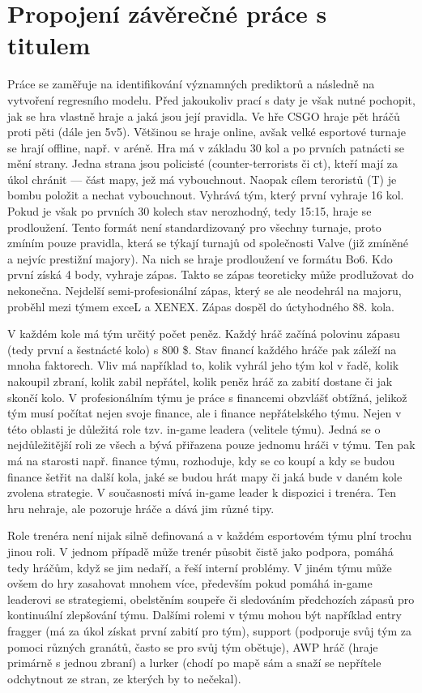 \newpage
\section{Propojení závěrečné práce s titulem}
Práce se zaměřuje na identifikování významných prediktorů a následně na vytvoření regresního modelu. Před jakoukoliv prací s daty je však nutné pochopit, jak se hra vlastně hraje
a jaká jsou její pravidla. Ve hře \ac{CSGO} hraje pět hráčů proti pěti (dále jen 5v5). Většinou se hraje online, avšak velké esportové turnaje se hrají offline, např. v aréně.
Hra má v základu 30 kol a po  prvních patnácti se mění strany. Jedna strana jsou policisté (counter-terrorists či ct), kteří mají za úkol chránit  --- část mapy,
jež má vybouchnout. Naopak cílem teroristů (T) je bombu položit a  nechat vybouchnout. Vyhrává tým, který první vyhraje 16 kol. Pokud je však po prvních 30 kolech
stav nerozhodný, tedy 15:15, hraje se prodloužení. Tento formát není standardizovaný pro všechny turnaje, proto zmíním pouze pravidla, která se týkají turnajů od společnosti
Valve (již zmíněné a nejvíc prestižní majory). Na nich se hraje prodloužení ve formátu Bo6. Kdo první získá 4 body, vyhraje zápas. Takto se zápas teoreticky může prodlužovat
do nekonečna. Nejdelší semi-profesionální zápas, který se ale neodehrál na majoru, proběhl mezi týmem exceL a XENEX\cite{professeur_hltvorg_2015}.
Zápas dospěl do úctyhodného 88. kola.

V každém kole má tým určitý počet peněz. Každý hráč začíná polovinu zápasu (tedy první a šestnácté kolo) s 800 \$. Stav financí každého hráče pak záleží na mnoha faktorech.
Vliv má například to, kolik vyhrál jeho tým kol v řadě, kolik nakoupil zbraní, kolik zabil nepřátel, kolik peněz hráč za zabití dostane či jak skončí kolo. V profesionálním
týmu je práce s financemi obzvlášť obtížná, jelikož tým musí počítat nejen svoje finance, ale i finance nepřátelského týmu. Nejen v této oblasti je důležitá role tzv. in-game
leadera (velitele týmu). Jedná se o nejdůležitější roli ze všech a bývá přiřazena pouze jednomu hráči v týmu. Ten pak má na starosti např. finance týmu, rozhoduje, kdy se co
koupí a kdy se budou finance šetřit na další kola, jaké se budou hrát mapy či jaká bude v daném kole zvolena strategie. V současnosti mívá in-game leader k dispozici i trenéra.
Ten hru nehraje, ale pozoruje hráče a dává jim
různé tipy.

Role trenéra není nijak silně definovaná a v každém esportovém týmu plní trochu jinou roli. V jednom případě může trenér působit čistě jako podpora, pomáhá tedy hráčům, když
se jim nedaří, a řeší interní problémy. V jiném týmu může ovšem do hry zasahovat mnohem více, především pokud pomáhá in-game leaderovi se strategiemi, obelstěním soupeře či
sledováním předchozích zápasů pro kontinuální zlepšování týmu. Dalšími rolemi v týmu mohou být například entry fragger (má za úkol získat první zabití pro tým), support
(podporuje svůj tým za pomoci různých granátů, často se pro svůj tým obětuje), AWP hráč (hraje primárně s jednou zbraní) a lurker (chodí po mapě sám a snaží se nepřítele
odchytnout ze stran, ze kterých by to nečekal).

